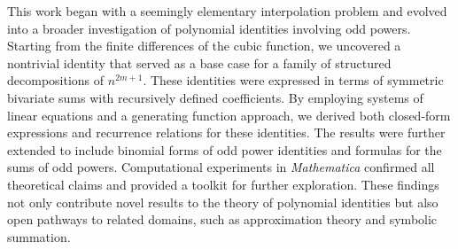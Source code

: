 This work began with a seemingly elementary interpolation problem and evolved into a broader
investigation of polynomial identities involving odd powers.
Starting from the finite differences of the cubic function, we uncovered a nontrivial identity
that served as a base case for a family of structured decompositions of $n^{2m+1}$.
These identities were expressed in terms of symmetric bivariate sums with recursively defined coefficients.
By employing systems of linear equations and a generating function approach,
we derived both closed-form expressions and recurrence relations for these identities.
The results were further extended to include binomial forms of odd power identities
and formulas for the sums of odd powers.
Computational experiments in \textit{Mathematica} confirmed all theoretical claims and provided
a toolkit for further exploration.
These findings not only contribute novel results to the theory of polynomial identities but also
open pathways to related domains, such as approximation theory and symbolic summation.
